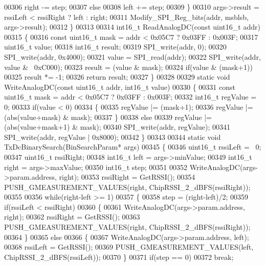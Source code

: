 \begin{DoxyCode}
{{{{{{{00306             right -= step;
00307         \textcolor{keywordflow}{else}
00308             left += step;
00309     \}
00310     args->result = rssiLeft < rssiRight ? left : right;
00311     Modify_SPI_Reg_bits(addr, msblsb, args->result);
00312 \}
00313 
00314 int16\_t ReadAnalogDC(\textcolor{keyword}{const} uint16\_t addr)
00315 \{
00316     \textcolor{keyword}{const} uint16\_t mask = addr < 0x05C7 ? 0x03FF : 0x003F;
00317     uint16\_t value;
00318     int16\_t result;
00319     SPI_write(addr, 0);
00320     SPI_write(addr, 0x4000);
00321     value = SPI_read(addr);
00322     SPI_write(addr, value & ~0xC000);
00323     result = (value & mask);
00324     \textcolor{keywordflow}{if}(value & (mask+1))
00325         result *= -1;
00326     \textcolor{keywordflow}{return} result;
00327 \}
00328 
00329 \textcolor{keyword}{static} \textcolor{keywordtype}{void} WriteAnalogDC(\textcolor{keyword}{const} uint16\_t addr, int16\_t value)
00330 \{
00331     \textcolor{keyword}{const} uint16\_t mask = addr < 0x05C7 ? 0x03FF : 0x003F;
00332     int16\_t regValue = 0;
00333     \textcolor{keywordflow}{if}(value < 0)
00334     \{
00335         regValue |= (mask+1);
00336         regValue |= (abs(value+mask) & mask);
00337     \}
00338     \textcolor{keywordflow}{else}
00339         regValue |= (abs(value+mask+1) & mask);
00340     SPI_write(addr, regValue);
00341     SPI_write(addr, regValue | 0x8000);
00342 \}
00343 
00344 \textcolor{keyword}{static} \textcolor{keywordtype}{void} TxDcBinarySearch(BinSearchParam* args)
00345 \{
00346     uint16\_t rssiLeft = ~0;
00347     uint16\_t rssiRight;
00348     int16\_t left = args->minValue;
00349     int16\_t right = args->maxValue;
00350     int16\_t step;
00351 
00352     WriteAnalogDC(args->param.address, right);
00353     rssiRight = GetRSSI();
00354     PUSH_GMEASUREMENT_VALUES(right, ChipRSSI\_2\_dBFS(rssiRight));
00355 
00356     \textcolor{keywordflow}{while}(right-left >= 1)
00357     \{
00358         step = (right-left)/2;
00359         \textcolor{keywordflow}{if}(rssiLeft < rssiRight)
00360         \{
00361             WriteAnalogDC(args->param.address, right);
00362             rssiRight = GetRSSI();
00363             PUSH_GMEASUREMENT_VALUES(right, ChipRSSI\_2\_dBFS(rssiRight));
00364         \}
00365         \textcolor{keywordflow}{else}
00366         \{
00367             WriteAnalogDC(args->param.address, left);
00368             rssiLeft = GetRSSI();
00369             PUSH_GMEASUREMENT_VALUES(left, ChipRSSI\_2\_dBFS(rssiLeft));
00370         \}
00371         \textcolor{keywordflow}{if}(step == 0)
00372             \textcolor{keywordflow}{break};
}}}}}}}
\end{DoxyCode}
